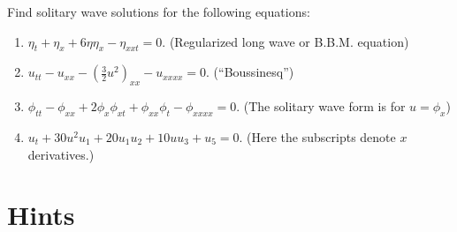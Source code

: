 \begin{Exercise}
  Find solitary wave solutions for the following equations:
  \begin{enumerate}
  \item $\eta_t + \eta_x + 6 \eta \eta_x - \eta_{xxt} = 0$. 
    (Regularized long wave or B.B.M. equation)
  \item $u_{tt} - u_{xx} - \left(\frac{3}{2} u^2\right)_{xx} - u_{xxxx}=0$.
    (``Boussinesq'')
  \item $\phi_{tt} - \phi_{xx} + 2 \phi_x \phi_{xt} + \phi_{xx} \phi_t
    - \phi_{xxxx} = 0$. (The solitary wave form is for $u=\phi_x$)
  \item $u_t + 30 u^2 u_1 + 20 u_1 u_2 + 10 u u_3 + u_5 = 0$.
    (Here the subscripts denote $x$ derivatives.)
  \end{enumerate}
\end{Exercise}






\raggedbottom
\pagebreak
\flushbottom
\section{Hints}







\begin{Hint}
\end{Hint}




\begin{Hint}
\end{Hint}



\begin{Hint}
\end{Hint}



\begin{Hint}
\end{Hint}



